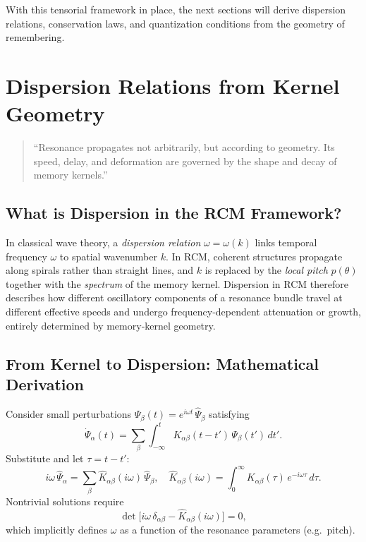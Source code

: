 With this tensorial framework in place, the next sections will derive dispersion relations, conservation laws, and quantization conditions from the geometry of remembering.  


\section{Dispersion Relations from Kernel Geometry}

\begin{quote}
“Resonance propagates not arbitrarily, but according to geometry.  
Its speed, delay, and deformation are governed by the shape and decay of memory kernels.”
\end{quote}

\subsection{What is Dispersion in the RCM Framework?}

In classical wave theory, a \emph{dispersion relation} $\omega=\omega(k)$ links temporal frequency $\omega$ to spatial wavenumber $k$.  In RCM, coherent structures propagate along spirals rather than straight lines, and $k$ is replaced by the \emph{local pitch} $p(\theta)$ together with the \emph{spectrum} of the memory kernel.  Dispersion in RCM therefore describes how different oscillatory components of a resonance bundle travel at different effective speeds and undergo frequency‐dependent attenuation or growth, entirely determined by memory‐kernel geometry.

\subsection{From Kernel to Dispersion: Mathematical Derivation}

Consider small perturbations $\Psi_\beta(t)=e^{i\omega t}\,\widehat\Psi_\beta$ satisfying
\[
\dot{\Psi}_\alpha(t)
= \sum_{\beta}\int_{-\infty}^{t}
  K_{\alpha\beta}(t-t')\,\Psi_\beta(t')\,dt'.
\]
Substitute and let $\tau=t-t'$:
\[
i\omega\,\widehat\Psi_\alpha
= \sum_{\beta}
  \widehat K_{\alpha\beta}(i\omega)\,\widehat\Psi_\beta,
\quad
\widehat K_{\alpha\beta}(i\omega)
= \int_{0}^{\infty}K_{\alpha\beta}(\tau)\,e^{-i\omega\tau}\,d\tau.
\]
Nontrivial solutions require
\[
\det\!\bigl[i\omega\,\delta_{\alpha\beta}
         - \widehat K_{\alpha\beta}(i\omega)\bigr]=0,
\]
which implicitly defines $\omega$ as a function of the resonance parameters (e.g.\ pitch).

